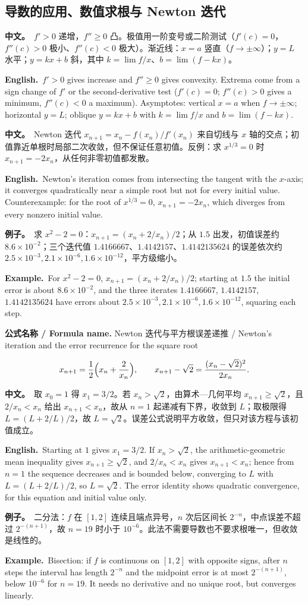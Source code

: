 \documentclass[UTF8,11pt,a4paper]{ctexart}
\newcommand{\BOTH}[2]{\par\noindent\textbf{中文。}\ #1\par\noindent\textbf{English.}\ #2\par}
\newcommand{\EX}[2]{\par\noindent\textbf{例子。}\ #1\par\noindent\textbf{Example.}\ #2\par}
\newcommand{\FORMULA}[2]{\par\noindent\textbf{公式名称 / Formula name.} #1 / #2\par}
\begin{document}
\subsection{导数的应用、数值求根与 Newton 迭代}
\BOTH{$f'>0$ 递增，$f''\ge0$ 凸。极值用一阶变号或二阶测试（$f'(c)=0$，$f''(c)>0$ 极小、$f''(c)<0$ 极大）。渐近线：$x=a$ 竖直（$f\to\pm\infty$）；$y=L$ 水平；$y=kx+b$ 斜，其中 $k=\lim f/x$、$b=\lim(f-kx)$。}{$f'>0$ gives increase and $f''\ge0$ gives convexity. Extrema come from a sign change of $f'$ or the second-derivative test ($f'(c)=0$; $f''(c)>0$ gives a minimum, $f''(c)<0$ a maximum). Asymptotes: vertical $x=a$ when $f\to\pm\infty$; horizontal $y=L$; oblique $y=kx+b$ with $k=\lim f/x$ and $b=\lim(f-kx)$.}
\BOTH{Newton 迭代 $x_{n+1}=x_n-f(x_n)/f'(x_n)$ 来自切线与 $x$ 轴的交点；初值靠近单根时局部二次收敛，但不保证任意初值。反例：求 $x^{1/3}=0$ 时 $x_{n+1}=-2x_n$，从任何非零初值都发散。}{Newton's iteration comes from intersecting the tangent with the $x$-axis; it converges quadratically near a simple root but not for every initial value. Counterexample: for the root of $x^{1/3}=0$, $x_{n+1}=-2x_n$, which diverges from every nonzero initial value.}
\EX{求 $x^2-2=0$：$x_{n+1}=(x_n+2/x_n)/2$；从 $1.5$ 出发，初值误差约 $8.6\times10^{-2}$；三个迭代值 $1.4166667$、$1.4142157$、$1.4142135624$ 的误差依次约 $2.5\times10^{-3},2.1\times10^{-6},1.6\times10^{-12}$，平方级缩小。}{For $x^2-2=0$, $x_{n+1}=(x_n+2/x_n)/2$; starting at $1.5$ the initial error is about $8.6\times10^{-2}$, and the three iterates $1.4166667$, $1.4142157$, $1.4142135624$ have errors about $2.5\times10^{-3},2.1\times10^{-6},1.6\times10^{-12}$, squaring each step.}
\FORMULA{Newton 迭代与平方根误差递推}{Newton's iteration and the error recurrence for the square root}
\[
x_{n+1}=\frac12\Bigl(x_n+\frac2{x_n}\Bigr),\qquad
x_{n+1}-\sqrt2=\frac{(x_n-\sqrt2)^2}{2x_n}.
\]
\BOTH{取 $x_0=1$ 得 $x_1=3/2$。若 $x_n>\sqrt2$，由算术—几何平均 $x_{n+1}\ge\sqrt2$，且 $2/x_n<x_n$ 给出 $x_{n+1}<x_n$，故从 $n=1$ 起递减有下界，收敛到 $L$；取极限得 $L=(L+2/L)/2$，故 $L=\sqrt2$。误差公式说明平方收敛，但只对该方程与该初值成立。}{Starting at $1$ gives $x_1=3/2$. If $x_n>\sqrt2$, the arithmetic-geometric mean inequality gives $x_{n+1}\ge\sqrt2$, and $2/x_n<x_n$ gives $x_{n+1}<x_n$; hence from $n=1$ the sequence decreases and is bounded below, converging to $L$ with $L=(L+2/L)/2$, so $L=\sqrt2$. The error identity shows quadratic convergence, for this equation and initial value only.}
\EX{二分法：$f$ 在 $[1,2]$ 连续且端点异号，$n$ 次后区间长 $2^{-n}$，中点误差不超过 $2^{-(n+1)}$，故 $n=19$ 时小于 $10^{-6}$。此法不需要导数也不要求根唯一，但收敛是线性的。}{Bisection: if $f$ is continuous on $[1,2]$ with opposite signs, after $n$ steps the interval has length $2^{-n}$ and the midpoint error is at most $2^{-(n+1)}$, below $10^{-6}$ for $n=19$. It needs no derivative and no unique root, but converges linearly.}
\end{document}
